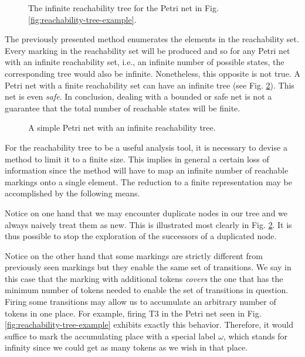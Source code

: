 \begin{figure}[!htb]
      \centering
      
      \caption{The infinite reachability tree for the Petri net in Fig.
            \ref{fig:reachability-tree-example}.}
      \label{fig:reachability-tree-final-step}
\end{figure}

The previously presented method enumerates the elements in the reachability set.
Every marking in the reachability set will be produced
and so for any Petri net with an infinite reachability set,
i.e., an infinite number of possible states,
the corresponding tree would also be infinite.
Nonetheless, this opposite is not true.
A Petri net with a finite reachability set can have an infinite tree
(see Fig. \ref{fig:reachability-tree-bounded-net-counterexample}).
This net is even \emph{safe}.
In conclusion, dealing with a bounded or safe net is not
a guarantee that the total number of reachable states will be finite.

\begin{figure}[!htb]
      \centering
      
      \caption{A simple Petri net with an infinite reachability tree.}
      \label{fig:reachability-tree-bounded-net-counterexample}
\end{figure}

For the reachability tree to be a useful analysis tool,
it is necessary to devise a method to limit it to a finite size.
This implies in general a certain loss of information since the method will have to map
an infinite number of reachable markings onto a single element.
The reduction to a finite representation may be accomplished by the following means.

Notice on one hand that we may encounter duplicate nodes
in our tree and we always naively treat them as new.
This is illustrated most clearly in Fig. \ref{fig:reachability-tree-bounded-net-counterexample}.
It is thus possible to stop the exploration of the successors of a duplicated node.

Notice on the other hand that some markings are strictly different from previously seen markings
but they enable the same set of transitions.
We say in this case that the marking with additional tokens \emph{covers} the one
that has the minimum number of tokens needed to enable the set of transitions in question.
Firing some transitions may allow us to accumulate an arbitrary number of tokens in one place.
For example, firing T3 in the Petri net seen in
Fig. \ref{fig:reachability-tree-example} exhibits exactly this behavior.
Therefore, it would suffice to mark the accumulating place
with a special label $\omega$, which stands for infinity
since we could get as many tokens as we wish in that place.

